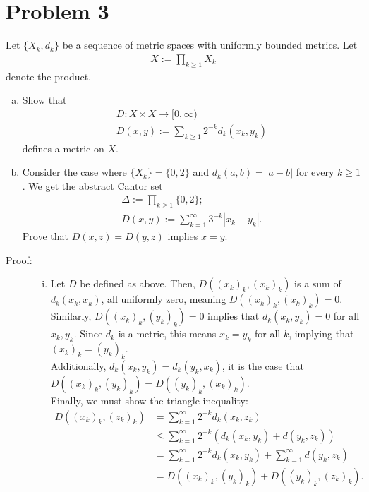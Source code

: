 \documentclass[8pt]{extarticle}
\begin{document}
  \section{Problem 3}%
  Let $\{X_k,d_k\}$ be a sequence of metric spaces with uniformly bounded metrics. Let
  \begin{align*}
    X := \prod_{k\geq 1} X_k
  \end{align*}
  denote the product.
  \begin{enumerate}[(a)]
    \item Show that
      \begin{align*}
        D: X\times X \rightarrow [0,\infty)\\
        D(x,y) := \sum_{k\geq1}2^{-k}d_k(x_k,y_k)
      \end{align*}
      defines a metric on $X$.
    \item Consider the case where $\{X_k\} = \{0,2\}$ and $d_k(a,b) = |a-b|$ for every $k\geq 1$. We get the abstract Cantor set
      \begin{align*}
        \Delta := \prod_{k\geq 1} \{0,2\};\\
        D(x,y) := \sum_{k=1}^{\infty}3^{-k}|x_k - y_k|.
      \end{align*}
      Prove that $D(x,z) = D(y,z)$ implies $x=y$.
  \end{enumerate}
  \begin{description}
    \item[Proof:]\hfill
      \begin{enumerate}[(i)]
        \item Let $D$ be defined as above. Then, $D((x_k)_k,(x_k)_k)$ is a sum of $d_k(x_k,x_k)$, all uniformly zero, meaning $D((x_k)_k,(x_k)_k)= 0$.\\

          Similarly, $D((x_k)_k,(y_k)_k) = 0$ implies that $d_k(x_k,y_k) = 0$ for all $x_k,y_k$. Since $d_k$ is a metric, this means $x_k = y_k$ for all $k$, implying that $(x_k)_k = (y_k)_k$.\\

          Additionally, $d_k(x_k,y_k) = d_k(y_k,x_k)$, it is the case that $D((x_k)_k,(y_k)_k) = D((y_k)_k,(x_k)_k)$.\\

          Finally, we must show the triangle inequality:
          \begin{align*}
            D((x_k)_k,(z_k)_k) &= \sum_{k=1}^{\infty}2^{-k}d_k(x_k,z_k)\\
                               &\leq \sum_{k=1}^{\infty}2^{-k}(d_k(x_k,y_k) + d(y_k,z_k))\\
                               &= \sum_{k=1}^{\infty}2^{-k}d_k(x_k,y_k) + \sum_{k=1}^{\infty}d(y_k,z_k)\\
                               &= D((x_k)_k,(y_k)_k) + D((y_k)_k,(z_k)_k).
          \end{align*}
      \end{enumerate}
  \end{description}
\end{document}
